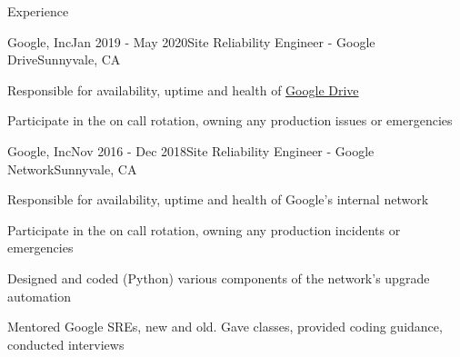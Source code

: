 \documentclass{resume}
\begin{document}
\begin{rSection}{Experience}
    \begin{rSubsection}{Google, Inc}{Jan 2019 - May 2020}{Site Reliability Engineer - Google Drive}{Sunnyvale, CA}
      \item Responsible for availability, uptime and health of \href{https://drive.google.com}{Google Drive}
      \item Participate in the on call rotation, owning any production issues or emergencies
    \end{rSubsection}

    \begin{rSubsection}{Google, Inc}{Nov 2016 - Dec 2018}{Site Reliability Engineer - Google Network}{Sunnyvale, CA}
      \item Responsible for availability, uptime and health of Google's internal network
      \item Participate in the on call rotation, owning any production incidents or emergencies
      \item Designed and coded (Python) various components of the network's upgrade automation
      \item Mentored Google SREs, new and old. Gave classes, provided coding guidance, conducted interviews
    \end{rSubsection}

\end{rSection}
\end{document}
